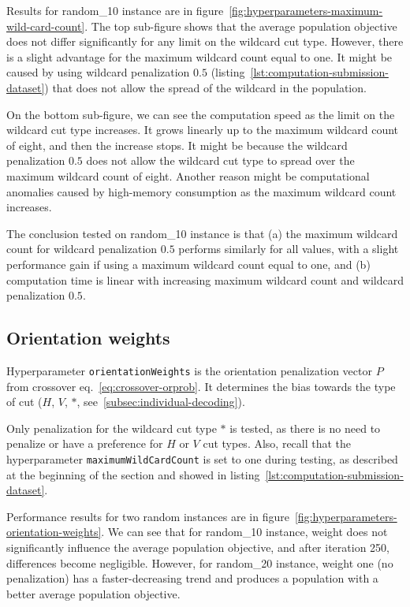 Results for random\_10 instance are in figure~\ref{fig:hyperparameters-maximum-wild-card-count}.
The top sub-figure shows that the average population objective does not differ significantly for any limit on the wildcard cut type.
However, there is a slight advantage for the maximum wildcard count equal to one.
It might be caused by using wildcard penalization $0.5$ (listing~\ref{lst:computation-submission-dataset})
that does not allow the spread of the wildcard in the population.

On the bottom sub-figure, we can see the computation speed as the limit on the wildcard cut type increases.
It grows linearly up to the maximum wildcard count of eight, and then the increase stops.
It might be because the wildcard penalization $0.5$ does not
allow the wildcard cut type to spread over the maximum wildcard count of eight.
Another reason might be computational anomalies caused by high-memory consumption as the maximum wildcard count increases.

The conclusion tested on random\_10 instance is that (a) the maximum wildcard count for wildcard penalization $0.5$
performs similarly for all values, with a slight performance gain if using a maximum wildcard count equal to one,
and (b) computation time is linear with increasing maximum wildcard count and wildcard penalization $0.5$.

\newpage
\subsection{Orientation weights}\label{subsec:orientation-weights}
Hyperparameter \verb|orientationWeights| is the orientation penalization vector $P$ from crossover eq.~\ref{eq:crossover-orprob}.
It determines the bias towards the type of cut ($H$, $V$, $*$, see~\ref{subsec:individual-decoding}).

Only penalization for the wildcard cut type $*$ is tested, as there is no need to penalize or have a preference for $H$ or $V$ cut types.
Also, recall that the hyperparameter \verb|maximumWildCardCount| is set to one during testing, as described at the beginning of the section and showed in listing~\ref{lst:computation-submission-dataset}.

Performance results for two random instances are in figure~\ref{fig:hyperparameters-orientation-weights}.
We can see that for random\_10 instance,
weight does not significantly influence the average population objective, and after iteration 250, differences become negligible.
However, for random\_20 instance,
weight one (no penalization) has a faster-decreasing trend and produces a population with a better average population objective.

